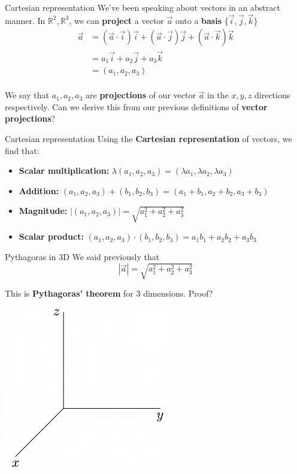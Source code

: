 \documentclass{beamer}
\begin{document}
\begin{frame}{Cartesian representation}
	We've been speaking about vectors in an abstract manner. In $\mathbb{R}^2, \mathbb{R}^3$, we can \textbf{project} a vector $\vec{a}$ onto a \textbf{basis} $\{\vec{i}, \vec{j}, \vec{k}\}$
	\begin{align*}
		\vec{a} &= (\vec{a}\cdot\vec{i})\vec{i} + (\vec{a}\cdot\vec{j})\vec{j} + (\vec{a}\cdot\vec{k})\vec{k}\\
				&= a_1\vec{i} + a_2\vec{j} + a_3\vec{k}\\
				&= (a_1, a_2, a_3)\\
	\end{align*}
	
	We say that $a_1, a_2, a_3$ are \textbf{projections} of our vector $\vec{a}$ in the $x, y, z$ directions respectively. Can we derive this from our previous definitions of \textbf{vector projections}?
\end{frame}

\begin{frame}{Cartesian representation}
	Using the \textbf{Cartesian representation} of vectors, we find that:
	\begin{itemize}
		\item \textbf{Scalar multiplication: } $\lambda(a_1, a_2, a_3) = (\lambda a_1, \lambda a_2, \lambda a_3)$
		\item \textbf{Addition: } $(a_1, a_2, a_3) + (b_1, b_2, b_3) = (a_1 + b_1, a_2 + b_2, a_3 + b_3)$
		\item \textbf{Magnitude: } $|(a_1, a_2, a_3)| = \sqrt{a_1^2 + a_2^2 + a_3^2}$
		\item \textbf{Scalar product: } $(a_1, a_2, a_3)\cdot(b_1, b_2, b_3) = a_1b_1 + a_2b_2 + a_3b_3$
	\end{itemize}
\end{frame}

\begin{frame}{Pythagoras in 3D}
	We said previously that
	$$|\vec{a}| = \sqrt{a_1^2 + a_2^2 + a_3^2}$$
	
	This is \textbf{Pythagoras' theorem} for 3 dimensions. Proof?
	\begin{center}
		\includegraphics[scale = 0.5]{img/axes.png}
	\end{center}
\end{frame}
\end{document}
